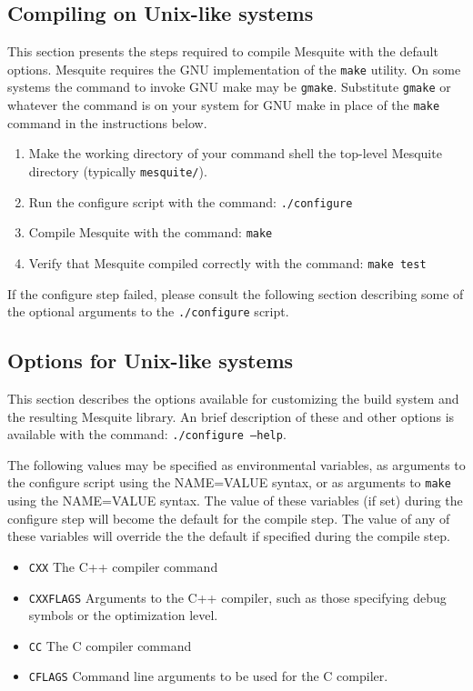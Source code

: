\documentclass[letter]{report}
\begin{document}
\subsection{Compiling on Unix-like systems}
This section presents the steps required to compile Mesquite with the default
options.  Mesquite requires the GNU implementation of the \texttt{make} utility.
On some systems the command to invoke GNU make may be \texttt{gmake}.  Substitute
\texttt{gmake} or whatever the command is on your system for GNU make in place of
the \texttt{make} command in the instructions below.
\begin{enumerate}
\item Make the working directory of your command shell the top-level Mesquite
directory (typically \texttt{mesquite/}).
\item Run the configure script with the command: \texttt{./configure}
\item Compile Mesquite with the command: \texttt{make} 
\item Verify that Mesquite compiled correctly with the command: \texttt{make test}
\end{enumerate}
If the configure step failed, please consult the following section describing 
some of the optional arguments to the \texttt{./configure} script. 
\subsection{Options for Unix-like systems}
This section describes the options available for customizing the build
system and the resulting Mesquite library.  An brief description of these
and other options is available with the command: \texttt{./configure --help}.

\label{mes_vars_and_defs}
The following values may be specified as environmental variables, as arguments
to the configure script using the NAME=VALUE syntax, or as arguments to \texttt{make}
using the NAME=VALUE syntax.  The value of these variables (if set) during the
configure step will become the default for the compile step.  The value of any
of these variables will override the the default if specified during the compile
step.
\begin{itemize}
\item \texttt{CXX}       The C++ compiler command
\item \texttt{CXXFLAGS}  Arguments to the C++ compiler, such as those specifying 
debug symbols or the optimization level.
\item \texttt{CC}        The C compiler command
\item \texttt{CFLAGS}    Command line arguments to be used for the C compiler.
\end{itemize}
\end{document}
